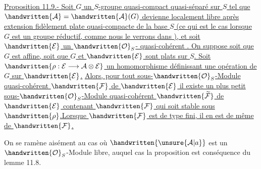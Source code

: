 \uline{Proposition 11.9.- Soit $G$ un $S$-groupe quasi-compact quasi-séparé sur $S$ tel que $\handwritten{\mathcal{A}}=\handwritten{\mathcal{A}}(G)$ devienne localement libre après extension fidèlement plate quasi-compacte de la base $S$ (ce qui est le cas lorsque $G$ est un groupe réductif, comme nous le verrons dans  ), et soit $\handwritten{\mathcal{E}}$ un $\handwritten{\mathcal{O}}_S$- quasi-cohérent . On suppose soit que $G$ est affine, soit que $G$ et $\handwritten{\mathcal{E}}$ sont plats sur $S$. Soit $\handwritten{\rho:\mathcal{E}\longrightarrow\mathcal{A}\otimes\mathcal{E}}$ un homomorphisme définissant une opération de $G$ sur $\handwritten{\mathcal{E}}$.}
\uline{Alors, pour tout sous-$\handwritten{\mathcal{O}}_S$-Module quasi-cohérent $\handwritten{\mathcal{F}}$ de $\handwritten{\mathcal{E}}$ il existe un plus petit sous-$\handwritten{\mathcal{O}}_S$-Module quasi-cohérent $\handwritten{\widetilde{\mathcal{F}}}$ de $\handwritten{\mathcal{E}}$ contenant $\handwritten{\mathcal{F}}$ qui soit stable sous $\handwritten{\rho}$.}\uline{Lorsque $\handwritten{\mathcal{F}}$ est de type  fini, il en est de même de $\handwritten{\mathcal{F}}$.}

On se ramène aisément au cas où $\handwritten{\unsure{\mathcal{A}|a}}$ est un $\handwritten{\mathcal{O}}_S$-Module libre, auquel cas la proposition est conséquence du lemme 11.8.

